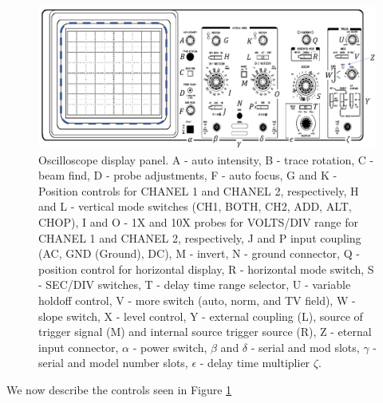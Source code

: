 \documentclass[12pt, a4paper, oneside, openright, titlepage]{book}
\begin{document}
\begin{figure}[H]
    \centering
    \includegraphics[scale = 0.8]{Images/ACDC6.PNG}
    \caption{Oscilloscope display panel. A - auto intensity, B - trace rotation, C - beam find, D - probe adjustments, F - auto focus, G and K - Position controls for CHANEL 1 and CHANEL 2, respectively, H and L - vertical mode switches (CH1, BOTH, CH2, ADD, ALT, CHOP), I and O - 1X and 10X probes for VOLTS/DIV range for CHANEL 1 and CHANEL 2, respectively, J and P input coupling (AC, GND (Ground), DC), M - invert, N - ground connector, Q - position control for horizontal display, R - horizontal mode switch, S - SEC/DIV switches, T - delay time range selector, U - variable holdoff control, V - more switch (auto, norm, and TV field), W - slope switch, X - level control, Y - external coupling (L), source of trigger signal (M) and internal source trigger source (R), Z - eternal input connector, $\alpha$ - power switch, $\beta$ and $\delta$ - serial and mod slots, $\gamma$ - serial and model number slots, $\epsilon$ - delay time multiplier $\zeta$.}
    \label{fig:ACDC6}
\end{figure}

We now describe the controls seen in Figure \ref{fig:ACDC6}
\end{document}
